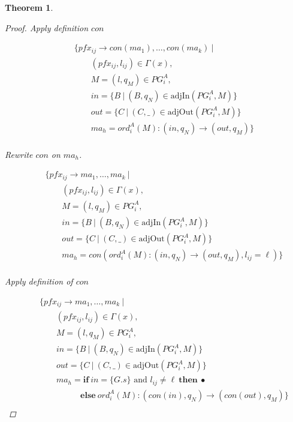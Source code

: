 \documentclass[twocolumn]{sig-alternate-10pt}
\newtheorem{thm}{Theorem}
\begin{document}
\begin{thm}
\begin{proof}
  Apply definition $con$

  \[ \begin{array}{l}
     ~~~~~~~~~ \{ pfx_{ij} \rightarrow con(ma_1), \dots, con(ma_k) ~\vert~ \\
     ~~~~~~~~~~~~~~~~~~ (pfx_{ij}, l_{ij}) \in \Gamma(x), \\
     ~~~~~~~~~~~~~~~~~~ M = (l,q_M) \in PG^A_i, \\
     ~~~~~~~~~~~~~~~~~~ in = \{ B ~\vert~ (B,q_N) \in \text{adjIn}(PG^A_i,M) \} \\
     ~~~~~~~~~~~~~~~~~~ out = \{ C ~\vert~ (C,\_) \in \text{adjOut}(PG^A_i,M) \} \\
     ~~~~~~~~~~~~~~~~~~ ma_h = ord^A_i(M) : (in,q_N) \rightarrow (out,q_M) \} \\
  \end{array} \]%

  Rewrite $con$ on $ma_h$.

  \[ \begin{array}{l}
     ~~~~~~~~~ \{ pfx_{ij} \rightarrow ma_1, \dots, ma_k ~\vert~ \\
     ~~~~~~~~~~~~~~~~~~ (pfx_{ij}, l_{ij}) \in \Gamma(x), \\
     ~~~~~~~~~~~~~~~~~~ M = (l,q_M) \in PG^A_i, \\
     ~~~~~~~~~~~~~~~~~~ in = \{ B ~\vert~ (B,q_N) \in \text{adjIn}(PG^A_i,M) \} \\
     ~~~~~~~~~~~~~~~~~~ out = \{ C ~\vert~ (C,\_) \in \text{adjOut}(PG^A_i,M) \} \\
     ~~~~~~~~~~~~~~~~~~ ma_h = con(ord^A_i(M) : (in,q_N) \rightarrow (out,q_M), l_{ij} = \ell) \} \\
  \end{array} \]%

  Apply definition of $con$

  \[ \begin{array}{l}
     ~~~~~~~~~ \{ pfx_{ij} \rightarrow ma_1, \dots, ma_k ~\vert~ \\
     ~~~~~~~~~~~~~~~~~~ (pfx_{ij}, l_{ij}) \in \Gamma(x), \\
     ~~~~~~~~~~~~~~~~~~ M = (l,q_M) \in PG^A_i, \\
     ~~~~~~~~~~~~~~~~~~ in = \{ B ~\vert~ (B,q_N) \in \text{adjIn}(PG^A_i,M) \} \\
     ~~~~~~~~~~~~~~~~~~ out = \{ C ~\vert~ (C,\_) \in \text{adjOut}(PG^A_i,M) \} \\
     ~~~~~~~~~~~~~~~~~~ ma_h = \textbf{if}~ in=\{ G.s \} \text{ and } l_{ij} \neq \ell ~\textbf{then}~ \bullet \\ 
     ~~~~~~~~~~~~~~~~~~~~~~~~~~~~~~~ \textbf{else}~ ord^A_i(M) : (con(in),q_N) \rightarrow (con(out),q_M) \} \\
  \end{array} \]%


\end{proof}
\end{thm}
\end{document}
